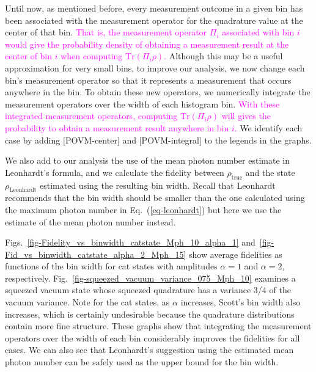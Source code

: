 \documentclass[
reprint,
superscriptaddress,
showpacs,
amsmath,
amssymb,
aps,
pra,
longbibliography
]{revtex4-1}
\providecommand{\editcolor}[2]{\textcolor{#1}{#2}}
\providecommand{\editcolor}[2]{#2}
\newcommand{\SG}[1]{\editcolor{magenta}{#1}}
\newcommand{\rhotrue}{\rho_{\text{true}}}
\begin{document}
Until now, as mentioned before, every measurement outcome in a given
bin has been associated with the measurement operator for the
quadrature value at the center of that bin. \SG{That is, the
  measurement operator $\Pi_{i}$ associated with bin $i$ would give the
  probability density of obtaining a measurement result at the center
  of bin $i$ when computing $\mathrm{Tr}(\Pi_{i}\rho)$.} Although this
may be a useful approximation for very small bins, to improve our
analysis, we now change each bin's measurement operator so that it
represents a measurement that occurs anywhere in the bin. To obtain
these new operators, we numerically integrate the measurement
operators over the width of each histogram bin. \SG{With these
  integrated measurement operators, computing
  $\mathrm{Tr}(\Pi_{i}\rho)$ will gives the probability to obtain a
  measurement result anywhere in bin $i$.} We identify each case by
adding $[$POVM-center$]$ and $[$POVM-integral$]$ to the legends in the
graphs.

We also add to our analysis the use of the mean photon number estimate
in Leonhardt's formula, and we calculate the fidelity between
$\rhotrue$ and the state $\rho_{\mathrm{Leonhardt}}$ estimated using
the resulting bin width. Recall that Leonhardt recommends that the bin
width should be smaller than the one calculated using the maximum photon 
number in Eq.~(\ref{eq-leonhardt}) but here we use the estimate of 
the mean photon number instead.

Figs.~\ref{fig-Fidelity_vs_binwidth_catstate_Mph_10_alpha_1}
and~\ref{fig-Fid_vs_binwidth_catstate_alpha_2_Mph_15} show average
fidelities as functions of the bin width for cat states with
amplitudes $\alpha=1$ and $\alpha=2$,
respectively. Fig.~\ref{fig-squeezed_vacuum_variance_075_Mph_10}
  examines a squeezed vacuum state whose squeezed quadrature has a
  variance 3/4 of the vacuum variance.  Note for the cat states, as
  $\alpha$ increases, Scott's bin width also increases, which is
  certainly undesirable because the quadrature distributions contain
  more fine structure.  These graphs show that integrating the
  measurement operators over the width of each bin considerably
  improves the fidelities for all cases. We can also see that
  Leonhardt's suggestion using the estimated mean photon number can be
  safely used as the upper bound for the bin width.
\end{document}
